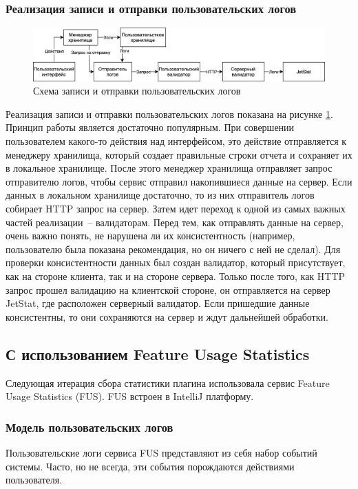 \documentclass[times]{itmo-student-thesis}
\begin{document}
\subsubsection{Реализация записи и отправки пользовательских логов}
\begin{figure}[!h]
\caption{Схема записи и отправки пользовательских логов}\label{jet-stat-logs}
\centering
\includegraphics[scale=0.2]{JetStat.png}
\end{figure}
Реализация записи и отправки пользовательских логов показана на рисунке \ref{jet-stat-logs}. Принцип работы является достаточно популярным. При совершении пользователем какого-то действия над интерфейсом, это действие отправляется к менеджеру хранилища, который создает правильные строки отчета и сохраняет их в локальное хранилище. После этого менеджер хранилища отправляет запрос отправителю логов, чтобы сервис отправил накопившиеся данные на сервер. Если данных в локальном хранилище достаточно, то из них отправитель логов собирает HTTP запрос на сервер. Затем идет переход к одной из самых важных частей реализации~-- валидаторам. Перед тем, как отправлять данные на сервер, очень важно понять, не нарушена ли их консистентность (например, пользователю была показана рекомендация, но он ничего с ней не сделал). Для проверки консистентности данных был создан валидатор, который присутствует, как на стороне клиента, так и на стороне сервера. Только после того, как HTTP запрос прошел валидацию на клиентской стороне, он отправляется на сервер JetStat, где расположен серверный валидатор. Если пришедшие данные консистентны, то они сохраняются на сервер и ждут дальнейшей обработки.
\subsection{С использованием Feature Usage Statistics}
Следующая итерация сбора статистики плагина использовала сервис Feature Usage Statistics (FUS). FUS встроен в IntelliJ платформу.
\subsubsection{Модель пользовательских логов}
Пользовательские логи сервиса FUS представляют из себя набор событий системы. Часто, но не всегда, эти события порождаются действиями пользователя.
\end{document}
